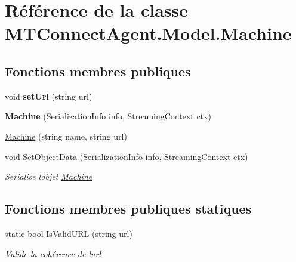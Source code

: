 \hypertarget{class_m_t_connect_agent_1_1_model_1_1_machine}{}\section{Référence de la classe M\+T\+Connect\+Agent.\+Model.\+Machine}
\label{class_m_t_connect_agent_1_1_model_1_1_machine}
\subsection*{Fonctions membres publiques}
\begin{DoxyCompactItemize}
\item 
\mbox{\label{class_m_t_connect_agent_1_1_model_1_1_machine_a06ffd7e8b7adb8b7306b0bc2a6662fb9}} 
void {\bfseries set\+Url} (string url)
\item 
\mbox{\label{class_m_t_connect_agent_1_1_model_1_1_machine_aa5b3b34432aa1586c337c6b46b17d0d9}} 
{\bfseries Machine} (Serialization\+Info info, Streaming\+Context ctx)
\item 
\mbox{\hyperlink{class_m_t_connect_agent_1_1_model_1_1_machine_a2fd689b697c2297a488219ac15765d1b}{Machine}} (string name, string url)
\item 
void \mbox{\hyperlink{class_m_t_connect_agent_1_1_model_1_1_machine_a6fca01ab63360a7ba3ae89772d9e9c48}{Set\+Object\+Data}} (Serialization\+Info info, Streaming\+Context ctx)
\begin{DoxyCompactList}\small\item\em Serialise l\textquotesingle{}objet \mbox{\hyperlink{class_m_t_connect_agent_1_1_model_1_1_machine}{Machine}} \end{DoxyCompactList}\end{DoxyCompactItemize}
\subsection*{Fonctions membres publiques statiques}
\begin{DoxyCompactItemize}
\item 
static bool \mbox{\hyperlink{class_m_t_connect_agent_1_1_model_1_1_machine_a472dfc91f16a8c67dd05d625afeb1ff0}{Is\+Valid\+U\+RL}} (string url)
\begin{DoxyCompactList}\small\item\em Valide la cohérence de l\textquotesingle{}url\end{DoxyCompactList}\end{DoxyCompactItemize}
